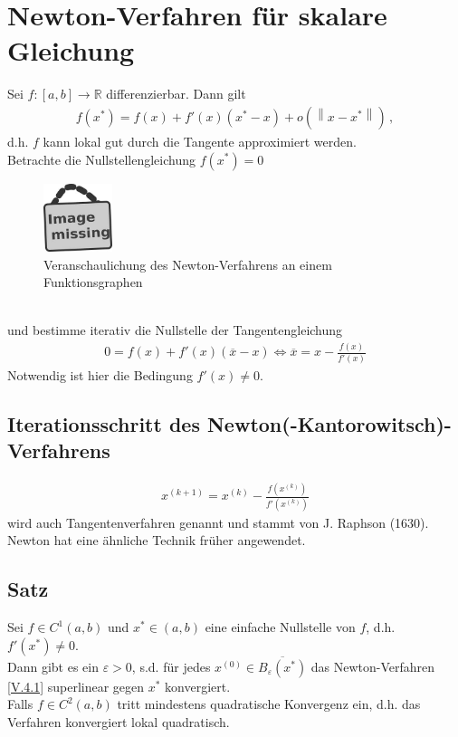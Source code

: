 \documentclass[ngerman,fontsize=11pt, paper=a4, parskip=half, titlepage=true, toc=bib]{scrbook}
\newcommand{\R}{\mathds{R}}
\newcommand{\nn}[1]{\left\| #1 \right\|}
\newcommand{\sectione}[1]{\section{#1} \setcounter{equation}{0}}
\newcommand{\imagemissing}[1]{
	\begin{figure}
		\centering
		\includegraphics[width=2cm]{images/image_missing.jpg}
		\caption{#1}
	\end{figure}
}
\begin{document}
	\sectione{Newton-Verfahren für skalare Gleichung} 
	Sei $f:[a,b]\longrightarrow \R$ differenzierbar. Dann gilt
	\begin{gather*}
		f(x^{*}) = f(x) + f'(x)(x^{*}-x)+o(\nn{x-x^{*}}) \, ,
	\end{gather*} 
	d.h. $f$ kann lokal gut durch die Tangente approximiert werden. \\
	Betrachte die Nullstellengleichung $f(x^{*}) = 0$ \\
	\imagemissing{Veranschaulichung des Newton-Verfahrens an einem Funktionsgraphen}\\
	und bestimme iterativ die Nullstelle der Tangentengleichung
	\begin{gather*}
		0=f(x) + f'(x)(\overline{x}-x) \Leftrightarrow \overline{x}= x-\frac{f(x)}{f'(x)}
	\end{gather*}
	Notwendig ist hier die Bedingung $f'(x) \neq 0$.
	
	
	\subsection{Iterationsschritt des Newton(-Kantorowitsch)-Verfahrens}
	\begin{gather}
		x^{(k+1)} = x^{(k)} - \frac{f(x^{(k)})}{f'(x^{(k)})}
		\label{V.4.1}
	\end{gather}
	wird auch Tangentenverfahren genannt und stammt von
	J. Raphson (1630). Newton hat eine ähnliche Technik früher angewendet.
	
	\subsection{Satz}\label{5.4.2}
	Sei $f\in C^1(a,b)$ und $x^{*}\in (a,b)$ eine einfache Nullstelle von $f$, d.h. $f'(x^{*})\neq 0$. \\
	Dann gibt es ein  $\varepsilon >0$, s.d. für jedes $x^{(0)}\in\overline{B_\varepsilon(x^{*})}$
	das Newton-Verfahren \eqref{V.4.1} superlinear gegen $x^{*}$ konvergiert.\\
	Falls $f\in C^2(a,b) $ tritt mindestens quadratische Konvergenz ein, d.h. das Verfahren
	konvergiert lokal quadratisch.
	
\end{document}
